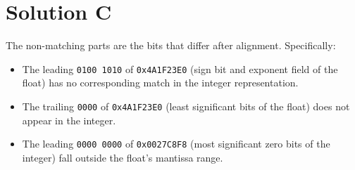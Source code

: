 \documentclass{article}
\begin{document}
\section*{\small Solution C}
\begin{flushleft}
    \footnotesize
    The non-matching parts are the bits that differ after alignment.
    Specifically:
    \begin{itemize}
        \item The leading \texttt{0100~1010} of \texttt{0x4A1F23E0} 
              (sign bit and exponent field of the float) has no corresponding 
              match in the integer representation.
        \item The trailing \texttt{0000} of \texttt{0x4A1F23E0} 
              (least significant bits of the float) does not appear in the 
              integer.
        \item The leading \texttt{0000~0000} of \texttt{0x0027C8F8} 
              (most significant zero bits of the integer) fall outside the 
              float's mantissa range.
    \end{itemize}
\end{flushleft}
\end{document}
